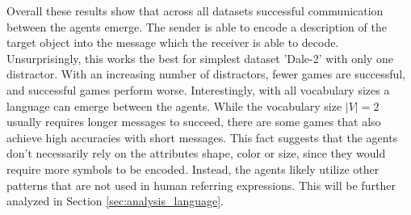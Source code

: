 Overall these results show that across all datasets successful communication between the agents emerge.
The sender is able to encode a description of the target object into the message which the receiver is able to decode.
Unsurprisingly, this works the best for simplest dataset 'Dale-2' with only one distractor.
With an increasing number of distractors, fewer games are successful, and successful games perform worse.
Interestingly, with all vocabulary sizes a language can emerge between the agents.
While the vocabulary size $|V|=2$ usually requires longer messages to succeed, there are some games that also achieve high accuracies with short messages.
This fact suggests that the agents don't necessarily rely on the attributes shape, color or size, since they would require more symbols to be encoded.
Instead, the agents likely utilize other patterns that are not used in human referring expressions.
This will be further analyzed in Section \ref{sec:analysis_language}.